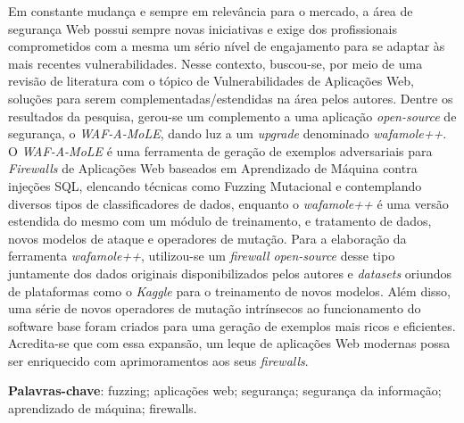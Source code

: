 \begin{resumo}
\begin{SingleSpace}
Em constante mudança e sempre em relevância para o mercado, a área de segurança Web possui sempre novas iniciativas e exige dos profissionais comprometidos com a mesma um sério nível de engajamento para se adaptar às mais recentes vulnerabilidades. Nesse contexto, buscou-se, por meio de uma revisão de literatura com o tópico de Vulnerabilidades de Aplicações Web, soluções para serem complementadas/estendidas na área pelos autores.
Dentre os resultados da pesquisa, gerou-se um complemento a uma aplicação \textit{open-source} de segurança, o \textit{WAF-A-MoLE}, dando luz a um \textit{upgrade} denominado \textit{wafamole++}. O \textit{WAF-A-MoLE} é uma ferramenta de geração de exemplos adversariais para \textit{Firewalls} de Aplicações Web baseados em Aprendizado de Máquina contra injeções SQL, elencando técnicas como Fuzzing Mutacional e contemplando diversos tipos de classificadores de dados, enquanto o \textit{wafamole++} é uma versão estendida do mesmo com um módulo de treinamento, e tratamento de dados, novos modelos de ataque e operadores de mutação. Para a elaboração da ferramenta \textit{wafamole++}, utilizou-se um \textit{firewall} \textit{open-source} desse tipo juntamente dos dados originais disponibilizados pelos autores e \textit{datasets} oriundos de plataformas como o \textit{Kaggle} para o treinamento de novos modelos. Além disso, uma série de novos operadores de mutação intrínsecos ao funcionamento do software base foram criados para uma geração de exemplos mais ricos e eficientes. Acredita-se que com essa expansão, um leque de aplicações Web modernas possa ser enriquecido com aprimoramentos aos seus \textit{firewalls}.
\end{SingleSpace}
\vspace{\onelineskip}
\textbf{Palavras-chave}: fuzzing; aplicações web; segurança; segurança da informação; aprendizado de máquina; firewalls.

\end{resumo}



